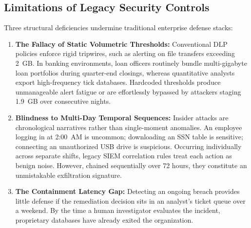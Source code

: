 \documentclass[conference]{IEEEtran}
\begin{document}
\subsection{Limitations of Legacy Security Controls}
Three structural deficiencies undermine traditional enterprise defense stacks:
\begin{enumerate}
    \item \textbf{The Fallacy of Static Volumetric Thresholds:} Conventional DLP policies enforce rigid tripwires, such as alerting on file transfers exceeding 2~GB. In banking environments, loan officers routinely bundle multi-gigabyte loan portfolios during quarter-end closings, whereas quantitative analysts export high-frequency tick databases. Hardcoded thresholds produce unmanageable alert fatigue or are effortlessly bypassed by attackers staging 1.9~GB over consecutive nights.
    \item \textbf{Blindness to Multi-Day Temporal Sequences:} Insider attacks are chronological narratives rather than single-moment anomalies. An employee logging in at 2:00~AM is uncommon; downloading an SSN table is sensitive; connecting an unauthorized USB drive is suspicious. Occurring individually across separate shifts, legacy SIEM correlation rules treat each action as benign noise. However, chained sequentially over 72 hours, they constitute an unmistakable exfiltration signature.
    \item \textbf{The Containment Latency Gap:} Detecting an ongoing breach provides little defense if the remediation decision sits in an analyst's ticket queue over a weekend. By the time a human investigator evaluates the incident, proprietary databases have already exited the organization.
\end{enumerate}
\end{document}
